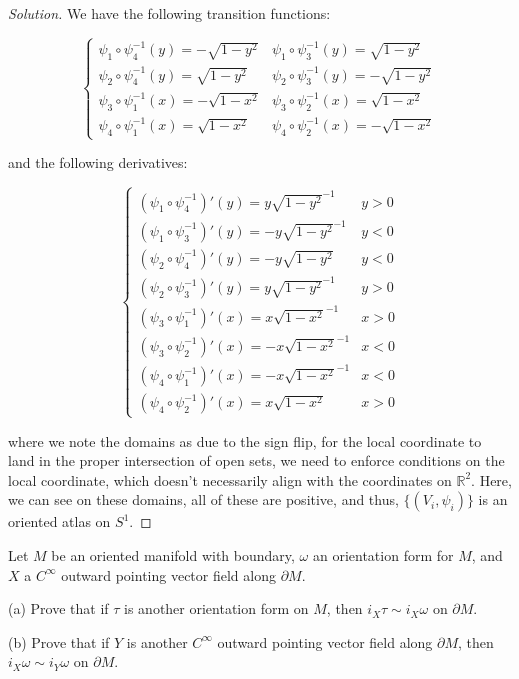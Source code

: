 \documentclass[10pt]{article}
\theoremstyle{nonumberplain}%
\newenvironment{problem}[2][]{\begin{trivlist}
\item[\hskip \labelsep {\bfseries #1}\hskip \labelsep {\bfseries #2.}]}{\end{trivlist}}
\begin{document}
\begin{proof}[Solution]
We have the following transition functions:

$$\begin{cases} \psi_1 \circ \psi_4^{-1}(y) = -\sqrt{1 - y^2} & \psi_1 \circ \psi_3^{-1}(y) = \sqrt{1 - y^2} \\  \psi_2 \circ \psi_4^{-1}(y) = \sqrt{1 - y^2} & \psi_2 \circ \psi_3^{-1}(y) = -\sqrt{1 - y^2}\\ \psi_3 \circ \psi_1^{-1}(x) =-\sqrt{1 - x^2} & \psi_3 \circ \psi_2^{-1}(x) =\sqrt{1 - x^2} \\ \psi_4 \circ \psi_1^{-1}(x) =\sqrt{1 - x^2} & \psi_4 \circ \psi_2^{-1}(x) =- \sqrt{1 - x^2} \end{cases} $$

and the following derivatives:

$$\begin{cases} (\psi_1 \circ \psi_4^{-1})'(y) = y\sqrt{1 - y^2}^{-1} & y > 0 \\ (\psi_1 \circ \psi_3^{-1})'(y) = -y\sqrt{1 - y^2}^{-1} & y < 0 \\  (\psi_2 \circ \psi_4^{-1})'(y) = -y\sqrt{1 - y^2} & y < 0 \\ (\psi_2 \circ \psi_3^{-1})'(y) = y\sqrt{1 - y^2}^{-1} & y > 0 \\ (\psi_3 \circ \psi_1^{-1})'(x) =x\sqrt{1 - x^2}^{-1} & x > 0 \\ (\psi_3 \circ \psi_2^{-1})'(x) =-x\sqrt{1 - x^2}^{-1} & x < 0 \\ (\psi_4 \circ \psi_1^{-1})'(x) =-x\sqrt{1 - x^2}^{-1} & x < 0 \\ (\psi_4 \circ \psi_2^{-1})'(x) =x\sqrt{1 - x^2} & x > 0 \end{cases} $$

where we note the domains as due to the sign flip, for the local coordinate to land in the proper intersection of open sets, we need to enforce conditions on the local coordinate, which doesn't necessarily align with the coordinates on $\mathbb{R}^2$. Here, we can see on these domains, all of these are positive, and thus, $\{ (V_i, \psi_i) \}$ is an oriented atlas on $S^1$.

\end{proof}

\begin{problem}{Question 4}

Let $M$ be an oriented manifold with boundary, $\omega$ an orientation form for $M$, and $X$ a $C^\infty$ outward pointing vector field along $\partial M$.

(a) Prove that if $\tau$ is another orientation form on $M$, then $i_X \tau \sim i_X \omega$ on $\partial M$.

(b) Prove that if $Y$ is another $C^\infty$ outward pointing vector field along $\partial M$, then $i_X \omega \sim i_Y \omega$ on $\partial M$.


\end{problem}
\end{document}
